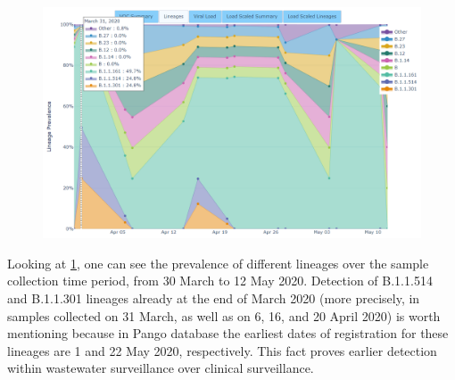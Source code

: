     \begin{figure}[ht!]
        \centering
        \includegraphics[width=1\textwidth]{figures/results/real/uk-freyja-dash-early-detection.png}
        \label{fig:results:real:uk-freyja-dash}
    \end{figure}
    
    Looking at \cref{fig:results:real:uk-freyja-dash}, one can see the prevalence of different lineages over the sample collection time period, from 30 March to 12 May 2020. Detection of B.1.1.514 and B.1.1.301 lineages already at the end of March 2020 (more precisely, in samples collected on 31 March, as well as on 6, 16, and 20 April 2020) is worth mentioning because in Pango database \cite{covlineages} the earliest dates of registration for these lineages are 1 and 22 May 2020, respectively. This fact proves earlier detection within wastewater surveillance over clinical surveillance.
\clearpage
